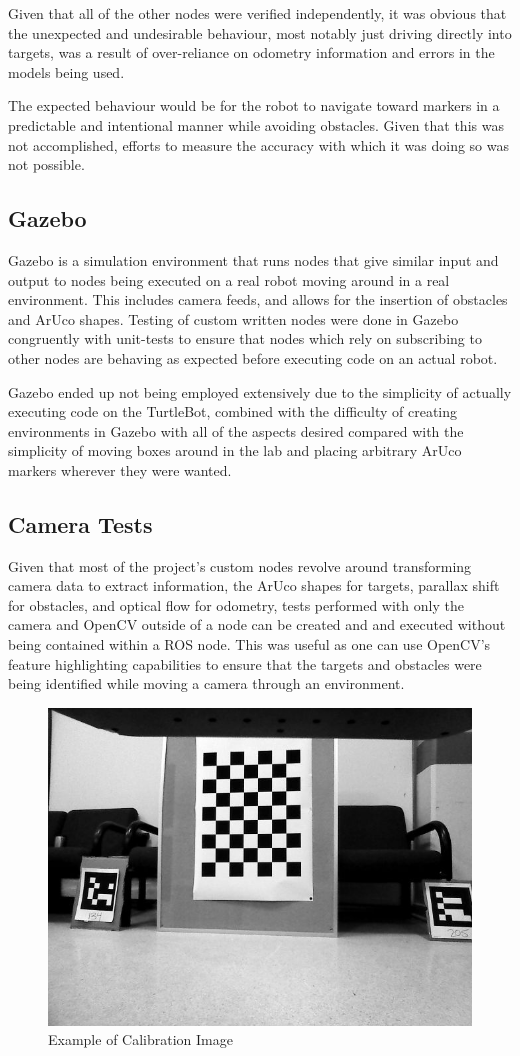 \documentclass{article}[12]
\begin{document}
	Given that all of the other nodes were verified independently, it was obvious that the unexpected and undesirable behaviour, most notably just driving directly into targets, was a result of over-reliance on odometry information and errors in the models being used. 
	
	The expected behaviour would be for the robot to navigate toward markers in a predictable and intentional manner while avoiding obstacles. Given that this was not accomplished, efforts to measure the accuracy with which it was doing so was not possible.
	
	\subsection{Gazebo}
	
	Gazebo is a simulation environment that runs nodes that give similar input and output to nodes being executed on a real robot moving around in a real environment. This includes camera feeds, and allows for the insertion of obstacles and ArUco shapes. Testing of custom written nodes were done in Gazebo congruently with unit-tests to ensure that nodes which rely on subscribing to other nodes are behaving as expected before executing code on an actual robot.
	
	Gazebo ended up not being employed extensively due to the simplicity of actually executing code on the TurtleBot, combined with the difficulty of creating environments in Gazebo with all of the aspects desired compared with the simplicity of moving boxes around in the lab and placing arbitrary ArUco markers wherever they were wanted.
	
	\subsection{Camera Tests}
	
	Given that most of the project's custom nodes revolve around transforming camera data to extract information, the ArUco shapes for targets, parallax shift for obstacles, and optical flow for odometry, tests performed with only the camera and OpenCV outside of a node can be created and and executed without being contained within a ROS node. This was useful as one can use OpenCV's feature highlighting capabilities to ensure that the targets and obstacles were being identified while moving a camera through an environment. 
	
	\begin{figure}[]
		\centering
		\includegraphics[width=0.5\linewidth]{calibration}
		\caption{Example of Calibration Image}
		\label{fig:calbcalbcalb}
	\end{figure}
	
\end{document}
